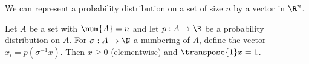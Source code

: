 
We can represent a probability distribution on a set of size $n$ by a vector in $\R^n$.


Let $A$ be a set with $\num{A} = n$ and let $p: A \to \R$ be a probability distribution on $A$.
For $\sigma: A \to \N$ a numbering of $A$, define the vector $x_i = p(\sigma^{-1}{x})$.
Then $x \geq 0$ (elementwise) and $\transpose{1} x = 1$.

\blankpage
